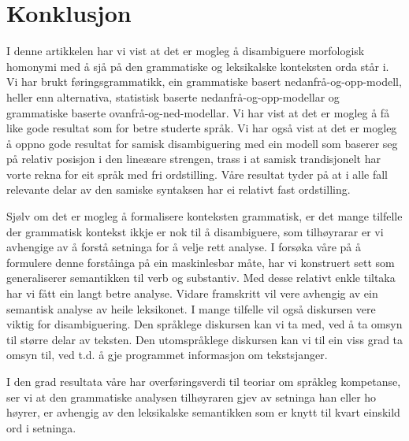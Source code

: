 \documentclass[a4paper,norsk]{article}
\begin{document}
\section{Konklusjon}

I denne artikkelen har vi vist at det er mogleg å disambiguere morfologisk homonymi med å sjå på den grammatiske og leksikalske konteksten orda står i. Vi har brukt føringsgrammatikk, ein grammatiske basert nedanfrå-og-opp-modell, heller enn alternativa, statistisk baserte nedanfrå-og-opp-modellar og grammatiske baserte ovanfrå-og-ned-modellar. Vi har vist at det er mogleg å få like gode resultat som for betre studerte språk. Vi har også vist at det er mogleg å oppno gode resultat for samisk disambiguering med ein modell som baserer seg på relativ posisjon i den lineæare strengen, trass i at samisk trandisjonelt har vorte rekna for eit språk med fri ordstilling. Våre resultat tyder på at i alle fall relevante delar av den samiske syntaksen har ei relativt fast ordstilling.  %

Sjølv om det er mogleg å formalisere konteksten grammatisk, er det mange tilfelle der grammatisk kontekst ikkje er nok til å disambiguere, som tilhøyrarar er vi avhengige av å forstå setninga for å velje rett analyse. I forsøka våre på å formulere denne forståinga på ein maskinlesbar måte, har vi konstruert sett som generaliserer semantikken til verb og substantiv. Med desse relativt enkle tiltaka har vi fått ein langt betre analyse. Vidare framskritt vil vere avhengig av ein semantisk analyse av heile leksikonet. I mange tilfelle vil også diskursen vere viktig for disambiguering. Den språklege diskursen kan vi ta med, ved å ta omsyn til større delar av teksten. Den utomspråklege diskursen kan vi til ein viss grad ta omsyn til, ved t.d. å gje programmet informasjon om tekstsjanger. %

I den grad resultata våre har overføringsverdi til teoriar om språkleg kompetanse, ser vi at den grammatiske analysen tilhøyraren gjev av setninga han eller ho høyrer, er avhengig av den leksikalske semantikken som er knytt til kvart einskild ord i setninga. %






\end{document}
